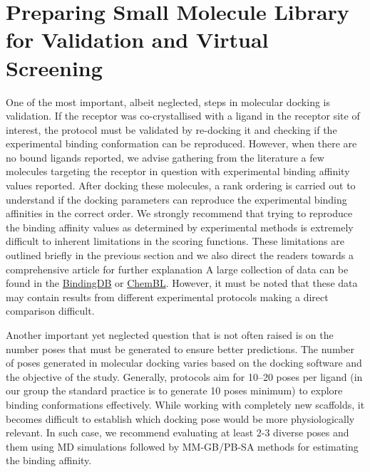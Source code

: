 \chapter*{Preparing Small Molecule Library for Validation and Virtual Screening}
One of the most important, albeit neglected, steps in molecular docking is validation. If the receptor was co-crystallised with a ligand in the receptor site of interest, the protocol must be validated by re-docking it and checking if the experimental binding conformation can be reproduced. However, when there are no bound ligands reported, we advise gathering from the literature a few molecules targeting the receptor in question with experimental binding affinity values reported. After docking these molecules, a rank ordering is carried out to understand if the docking parameters can reproduce the experimental binding affinities in the correct order. We strongly recommend that trying to reproduce the binding affinity values as determined by experimental methods is extremely difficult to inherent limitations in the scoring functions. These limitations are outlined briefly in the previous section and we also direct the readers towards a comprehensive article for further explanation\cite{bib54} A large collection of data can be found in the \href{https://www.bindingdb.org/rwd/bind/index.jsp}{BindingDB} or  \href{https://www.ebi.ac.uk/chembl/}{ChemBL}. However, it must be noted that these data may contain results from different experimental protocols making a direct comparison difficult.

Another important yet neglected question that is not often raised is on the number poses that must be generated to ensure better predictions. The number of poses generated in molecular docking varies based on the docking software and the objective of the study. Generally, protocols aim for 10–20 poses per ligand (in our group the standard practice is to generate 10 poses minimum)\cite{bib10} to explore binding conformations effectively. While working with completely new scaffolds, it becomes difficult to establish which docking pose would be more physiologically relevant. In such case, we recommend evaluating at least 2-3 diverse poses and them using MD simulations followed by MM-GB/PB-SA methods for estimating the binding affinity.
